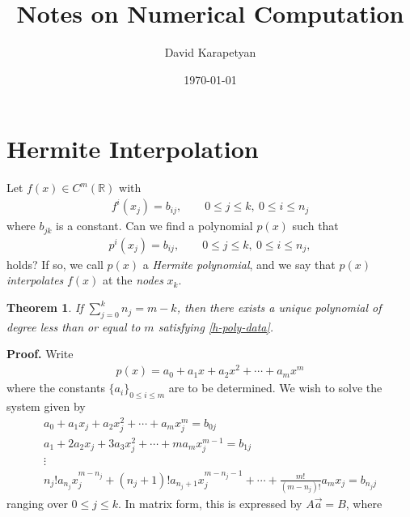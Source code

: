 \documentclass[12pt,reqno]{amsart}
\numberwithin{equation}{section}  %
\newcommand{\rr}{\mathbb{R}}
\newtheorem{theorem}{Theorem}[section]
\begin{document}
\title{Notes on Numerical Computation }
\author{David Karapetyan}
\date{\today}
%
\maketitle
%
%
%
%
%
%
\section{Hermite Interpolation}
Let $f(x) \in C^m(\rr)$ with
\begin{equation}
\label{hinterp-data}
\begin{split}
f^i(x_j) = b_{i j }, \qquad 0 \le j \le k, \ 0 \le i \le n_j
\end{split}
\end{equation}
where $b_{j k}$ is a constant. Can we find a polynomial $p(x)$ such that
\begin{equation}
\label{h-poly-data}
\begin{split}
p^i(x_j) = b_{i j}, \qquad 0 \le j \le k, \ 0 \le i \le n_j,
\end{split}
\end{equation}
holds? If so, we call $p(x)$ a \emph{Hermite polynomial}, and we say that $p(x)$
\emph{interpolates} $f(x)$ at the \emph{nodes} $x_k$.
\begin{theorem}
If $\sum_{j=0}^{k} n_{j} = m-k$, then there exists a unique polynomial of
degree less than or equal to $m$ satisfying \eqref{h-poly-data}.
\end{theorem}
{\bf Proof.} Write
\begin{equation*}
\begin{split}
p(x) = a_0 + a_{1}x + a_{2}x^2 +\cdots+ a_{m}x^m
\end{split}
\end{equation*}
where the constants $\{a_i\}_{0 \le i \le m}$ are to be determined. We wish to solve
the system given by
\begin{gather*}
a_{0}+a_{1}x_{j} + a_{2}x_{j}^2 +\cdots+a_{m}x_{j}^{m} = b_{0 j}
\\
a_{1} + 2 a_{2}x_{j} + 3a_{3}x_{j}^2 + \cdots+ m a_{m}x_{j}^{m-1} =
b_{1j}
\\
\vdots
\\
n_j! a_{ n_{j}} x_{j}^{m -n_{j}} +
(n_j + 1)! a_{n_{j}+1}
x_{j}^{m - n_{j}-1} + \cdots + \frac{m!}{(m-n_j)!} a_{m}x_{j} = b_{n_j j}
\end{gather*}
ranging over $0 \le j \le k$. In matrix form, this is expressed by $A\vec{a}=B$, where
\end{document}
